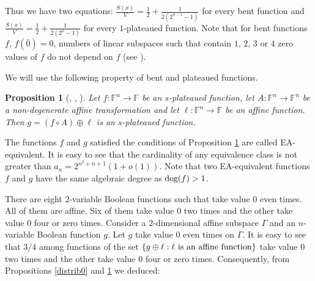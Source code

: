 \documentclass[a4paper,12pt]{article}   %
\newtheorem{proposition}{Proposition}
\begin{document}
Thus we have two equations: $\frac{S(x)}{V}=\frac12
+\frac{1}{2(2^{n-1}-1)}$ for every bent function and
$\frac{S(x)}{V}=\frac12 +\frac{1}{2(2^{n}-1)}$ for every
$1$-plateaued function. Note that for  bent functions $f$, $f(\bar{
0})=0$,  numbers of  linear subspaces such that contain $1$, $2$,
$3$ or $4$  zero values of $f$ do not depend on  $f$ (see
\cite{PA}).






We will use the following property of bent and plateaued functions.

\begin{proposition}[\cite{Carlet}, \cite{CarMes}, \cite{Mes0}]\label{splat12}
Let $f:{\mathbb{F}}^n\rightarrow {\mathbb{F}}$ be an $s$-plateaued
function, let $A:{\mathbb{F}}^n\rightarrow {\mathbb{F}}^n$ be a
non-degenerate affine transformation and let
$\ell:{\mathbb{F}}^n\rightarrow {\mathbb{F}}$ be an affine function.
Then $g=(f\circ A)\oplus\ell$ is an $s$-plateaued  function.
\end{proposition}

The functions $f$ and $g$ satisfied the conditions of Proposition
\ref{splat12} are called EA-equivalent. It is easy to see that the
cardinality of any equivalence class is not greater than
$a_n=2^{n^2+n+1}(1+o(1))$. Note that two EA-equivalent functions $f$
and $g$ have the same algebraic degree as ${\rm deg}(f)>1$.

There are eight  $2$-variable Boolean functions such that take value
$0$ even times.  All of them are affine. Six of them take value $0$
two times and the other take value $0$ four or zero times. Consider
a $2$-dimensional affine subspace $\Gamma$ and an $n$-variable
Boolean function $g$. Let $g$ take value $0$ even times on $\Gamma$.
It is easy to see that $3/4$ among functions of the  set $\{g\oplus
\ell : \ell\ \mbox{\rm is an affine function}\}$  take value $0$ two
times and the other take value $0$ four or zero times. Consequently,
from Propositions \ref{distrib0} and  \ref{splat12} we deduced:
\end{document}

